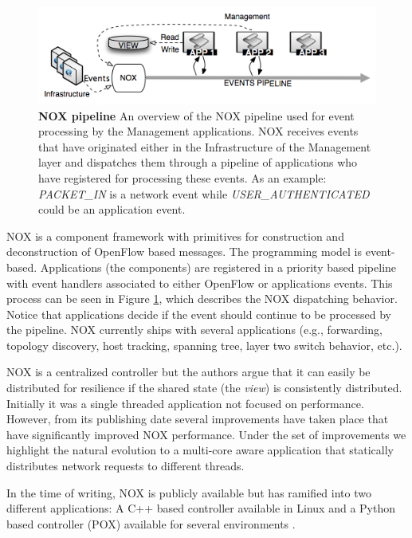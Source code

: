 \begin{itemize}
\begin{figure}
  \centering 
  \footnotesize
  \includegraphics[scale=0.5]{pic/nox-pipeline}
  \caption[NOX pipeline] {\textbf{NOX pipeline} An overview of the NOX
    pipeline used for event processing by the Management applications. NOX
  receives events that have originated either in the Infrastructure of
the Management layer and dispatches them through a pipeline of
applications who have registered for processing these events. 
 As an example: \emph{PACKET\_IN} is a network event while
\emph{USER\_AUTHENTICATED} could be an application event.}
  \label{fig:nox-pipeline}
\end{figure}

NOX is a component framework with primitives for
construction and deconstruction of OpenFlow
based messages. The programming model is event-based. Applications (the components) are registered in a
priority based pipeline with event handlers associated to either
OpenFlow or applications events. This process can be seen in Figure
\ref{fig:nox-pipeline}, which describes the NOX dispatching behavior. Notice
that applications decide if the event should continue to be processed
by the pipeline. NOX  currently ships
with several applications (e.g., forwarding, topology discovery, host
tracking, spanning tree, layer two switch behavior, etc.).

NOX is a centralized controller  but the authors argue that it can easily be distributed for resilience if the shared state (the \emph{view}) is consistently distributed. 
Initially it was a single threaded application not focused on
performance. However, from its publishing date 
several improvements have taken place
\cite{Tootoonchian:2012uia,zen-doc-thesis} that have significantly improved
NOX performance. Under the set of improvements we highlight the
natural evolution to a multi-core aware application
that statically distributes network requests to different threads. 

In the time of writing, NOX is publicly available but has ramified into
two different applications: A C++ based controller available in
Linux and a Python  based controller (POX) available for
several environments \cite{nox}.


\end{itemize}
